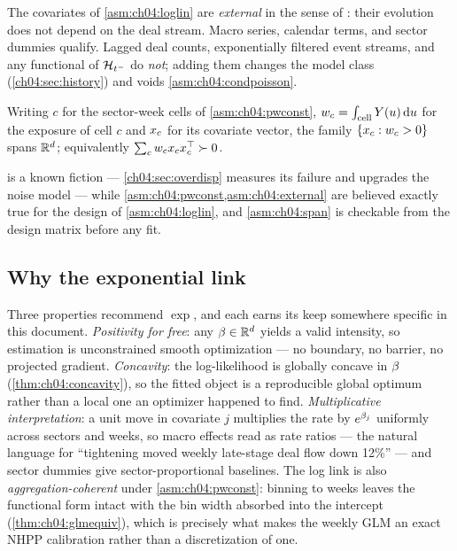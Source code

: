 \begin{assumption}\label{asm:ch04:external}
The covariates of \cref{asm:ch04:loglin} are \emph{external} in the sense
of \citet{kalbfleisch2002}: their evolution does not depend on the deal
stream. Macro series, calendar terms, and sector dummies qualify. Lagged
deal counts, exponentially filtered event streams, and any functional of
$\mathcal{H}_{t^-}$ do \emph{not}; adding them changes the model class
(\cref{ch04:sec:history}) and voids \cref{asm:ch04:condpoisson}.
\end{assumption}

\begin{assumption}[Spanning]\label{asm:ch04:span}
Writing $c$ for the sector-week cells of \cref{asm:ch04:pwconst}, $w_c =
\int_{\text{cell}} Y(u) \,\mathrm{d} u$ for the exposure of cell $c$ and
$x_c$ for its covariate vector, the family $\{x_c : w_c > 0\}$
spans $\mathbb{R}^{d}$; equivalently $\sum_c w_c x_c x_c^{\top} \succ 0$.
\end{assumption}

 is a known fiction --- \cref{ch04:sec:overdisp}
measures its failure and upgrades the noise model --- while
\cref{asm:ch04:pwconst,asm:ch04:external} are believed exactly true for
the design of \cref{asm:ch04:loglin}, and \cref{asm:ch04:span} is checkable
from the design matrix before any fit.

\subsection{Why the exponential link}\label{ch04:sec:link}

Three properties recommend $\exp$, and each earns its keep somewhere
specific in this document. \emph{Positivity for free}: any $\beta \in
\mathbb{R}^{d}$ yields a valid intensity, so estimation is unconstrained smooth
optimization --- no boundary, no barrier, no projected gradient.
\emph{Concavity}: the log-likelihood is globally concave in $\beta$
(\cref{thm:ch04:concavity}), so the fitted object is a reproducible global
optimum rather than a local one an optimizer happened to find.
\emph{Multiplicative interpretation}: a unit move in covariate $j$
multiplies the rate by $e^{\beta_j}$ uniformly across sectors and weeks,
so macro effects read as rate ratios --- the natural language for
``tightening moved weekly late-stage deal flow down 12\%'' --- and sector
dummies give sector-proportional baselines. The log link is also
\emph{aggregation-coherent} under \cref{asm:ch04:pwconst}: binning to weeks
leaves the functional form intact with the bin width absorbed into the
intercept (\cref{thm:ch04:glmequiv}), which is precisely what makes the
weekly GLM an exact NHPP calibration rather than a discretization of one.

